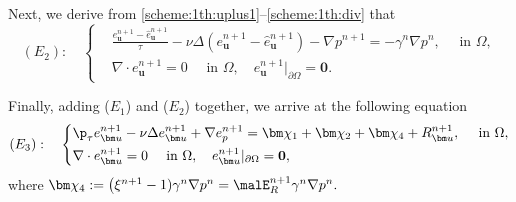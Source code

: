 Next, we derive from \eqref{scheme:1th:uplus1}--\eqref{scheme:1th:div} that 
\begin{equation*} 
	(E_2): \quad   \left\{
	\begin{aligned}
		& \frac{e_{\bm u}^{n+1}-\widehat{e}_{\bm u}^{n+1}}{\tau} -\nu \Delta(e_{\bm u}^{n+1}-\widehat{e}_{\bm u}^{n+1})-\nabla p^{n+1}=-\gamma^n \nabla p^n, \quad \text { in } \Omega, \\ 
		& \nabla \cdot e_{\bm u}^{n+1}=0 \quad \text { in } \Omega,\quad e_{\bm u}^{n+1}|_{\partial \Omega}=\mathbf{0}. 
	\end{aligned}
	\right. 
\end{equation*}

Finally, adding ($E_1$) and ($E_2$) together, we arrive at the following equation
\begin{equation*} 
	(E_3): \quad   \left\{
	\begin{aligned}
		& \p_\tau e_{\bm u}^{n+1}-\nu\Delta e_{\bm u}^{n+1}+\nabla e_p^{n+1}=\bm \chi_1 +\bm \chi_2 + \bm \chi_4 +R_{\bm u}^{n+1},  \quad \text { in } \Omega, \\
		& \nabla \cdot e_{\bm u}^{n+1}=0 \quad \text { in } \Omega, \quad e_{\bm u}^{n+1}|_{\partial \Omega}=\mathbf{0}, 
	\end{aligned}
	\right. 
\end{equation*}
where 
$
\bm \chi_4 := \big(\xi^{n+1}-1)\gamma^n \nabla p^n= \malE_R^{n+1}\gamma^n \nabla p^n.
$

